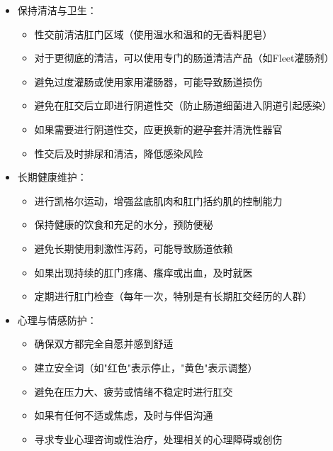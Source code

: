 \documentclass[12pt,UTF8]{ctexbook}
\begin{document}
\begin{itemize}
\begin{itemize}
\begin{itemize}
			\item 避免使用油基润滑剂（如凡士林、婴儿油），它们会损坏避孕套并增加感染风险
			\item 确保充分的前戏和放松（至少15-20分钟，直到肛门括约肌完全放松）
			\item 避免强行插入或过度用力，遵循"慢而稳"的原则
			\item 从较小的插入物开始（如手指、小型肛塞），逐渐过渡到较大的插入物
			\item 使用有圆头和光滑表面的性玩具，避免尖锐或有棱角的物体
			\item 保持指甲短而光滑，避免刮伤肛门周围皮肤和直肠黏膜
		\end{itemize}
		\item 保持清洁与卫生：
		\begin{itemize}
			\item 性交前清洁肛门区域（使用温水和温和的无香料肥皂）
			\item 对于更彻底的清洁，可以使用专门的肠道清洁产品（如Fleet灌肠剂）
			\item 避免过度灌肠或使用家用灌肠器，可能导致肠道损伤
			\item 避免在肛交后立即进行阴道性交（防止肠道细菌进入阴道引起感染）
			\item 如果需要进行阴道性交，应更换新的避孕套并清洗性器官
			\item 性交后及时排尿和清洁，降低感染风险
		\end{itemize}
		\item 长期健康维护：
		\begin{itemize}
			\item 进行凯格尔运动，增强盆底肌肉和肛门括约肌的控制能力
			\item 保持健康的饮食和充足的水分，预防便秘
			\item 避免长期使用刺激性泻药，可能导致肠道依赖
			\item 如果出现持续的肛门疼痛、瘙痒或出血，及时就医
			\item 定期进行肛门检查（每年一次，特别是有长期肛交经历的人群）
		\end{itemize}
		\item 心理与情感防护：
		\begin{itemize}
			\item 确保双方都完全自愿并感到舒适
			\item 建立安全词（如"红色"表示停止，"黄色"表示调整）
			\item 避免在压力大、疲劳或情绪不稳定时进行肛交
			\item 如果有任何不适或焦虑，及时与伴侣沟通
			\item 寻求专业心理咨询或性治疗，处理相关的心理障碍或创伤
		\end{itemize}
	\end{itemize}
\end{itemize}
\end{document}
